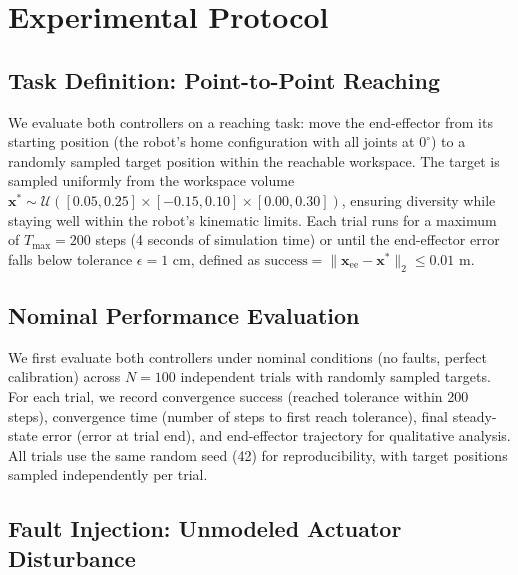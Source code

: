 \documentclass[12pt,a4paper,oneside]{report}
\begin{document}
\section{Experimental Protocol}

\subsection{Task Definition: Point-to-Point Reaching}
\label{subsec:task_definition_point_to_point_reaching}

We evaluate both controllers on a reaching task: move the end-effector from its starting position (the robot's home configuration with all joints at $0^\circ$) to a randomly sampled target position within the reachable workspace. The target is sampled uniformly from the workspace volume $\mathbf{x}^* \sim \mathcal{U}([0.05, 0.25] \times [-0.15, 0.10] \times [0.00, 0.30])$, ensuring diversity while staying well within the robot's kinematic limits. Each trial runs for a maximum of $T_{\text{max}} = 200$ steps (4 seconds of simulation time) or until the end-effector error falls below tolerance $\epsilon = 1$ cm, defined as $\text{success} = \|\mathbf{x}_{\text{ee}} - \mathbf{x}^*\|_2 \leq 0.01$ m.

\subsection{Nominal Performance Evaluation}
\label{subsec:nominal_performance_evaluation}

We first evaluate both controllers under nominal conditions (no faults, perfect calibration) across $N = 100$ independent trials with randomly sampled targets. For each trial, we record convergence success (reached tolerance within 200 steps), convergence time (number of steps to first reach tolerance), final steady-state error (error at trial end), and end-effector trajectory for qualitative analysis. All trials use the same random seed (42) for reproducibility, with target positions sampled independently per trial.

\subsection{Fault Injection: Unmodeled Actuator Disturbance}
\label{subsec:fault_injection_unmodeled_actuator_disturbance}
\end{document}
